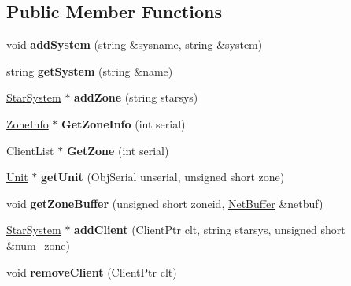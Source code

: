 \subsection*{Public Member Functions}
\begin{DoxyCompactItemize}
\item 
void {\bfseries add\+System} (string \&sysname, string \&system)\hypertarget{classZoneMgr_a7ed9c6dd0c7c7dcc3d764cbe2051b859}{}\label{classZoneMgr_a7ed9c6dd0c7c7dcc3d764cbe2051b859}

\item 
string {\bfseries get\+System} (string \&name)\hypertarget{classZoneMgr_ad543cb968e3ab6af80870e3f25f0b0c8}{}\label{classZoneMgr_ad543cb968e3ab6af80870e3f25f0b0c8}

\item 
\hyperlink{classStarSystem}{Star\+System} $\ast$ {\bfseries add\+Zone} (string starsys)\hypertarget{classZoneMgr_acb247072696062e22eeeef28b80a205a}{}\label{classZoneMgr_acb247072696062e22eeeef28b80a205a}

\item 
\hyperlink{classZoneInfo}{Zone\+Info} $\ast$ {\bfseries Get\+Zone\+Info} (int serial)\hypertarget{classZoneMgr_afec6d6633a09d78c4c6119ec516f697f}{}\label{classZoneMgr_afec6d6633a09d78c4c6119ec516f697f}

\item 
Client\+List $\ast$ {\bfseries Get\+Zone} (int serial)\hypertarget{classZoneMgr_a04bb37a47748379118027259136a3a8d}{}\label{classZoneMgr_a04bb37a47748379118027259136a3a8d}

\item 
\hyperlink{classUnit}{Unit} $\ast$ {\bfseries get\+Unit} (Obj\+Serial unserial, unsigned short zone)\hypertarget{classZoneMgr_a7c24d53c0e228c36b0c0f32121a7488e}{}\label{classZoneMgr_a7c24d53c0e228c36b0c0f32121a7488e}

\item 
void {\bfseries get\+Zone\+Buffer} (unsigned short zoneid, \hyperlink{classNetBuffer}{Net\+Buffer} \&netbuf)\hypertarget{classZoneMgr_a129a9c62d8272d6c9dcb18944d186dab}{}\label{classZoneMgr_a129a9c62d8272d6c9dcb18944d186dab}

\item 
\hyperlink{classStarSystem}{Star\+System} $\ast$ {\bfseries add\+Client} (Client\+Ptr clt, string starsys, unsigned short \&num\+\_\+zone)\hypertarget{classZoneMgr_ae168efd6955ee541dd512c8596b61ffe}{}\label{classZoneMgr_ae168efd6955ee541dd512c8596b61ffe}

\item 
void {\bfseries remove\+Client} (Client\+Ptr clt)\hypertarget{classZoneMgr_af7a78e23bb74847431a1cc18ee06c7fd}{}\label{classZoneMgr_af7a78e23bb74847431a1cc18ee06c7fd}


\end{DoxyCompactItemize}
